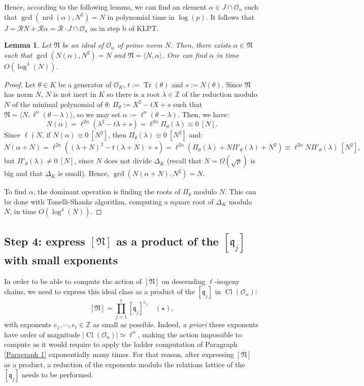 \documentclass[a4paper,10pt,notitlepage]{report}
\theoremstyle{definition}
\theoremstyle{plain}
\newtheorem{Lemma}[Definition]{Lemma}
\theoremstyle{definition}
\newcommand{\Z}{\mathbb{Z}}
\newcommand{\m}[1]{\mathcal{#1}}
\newcommand{\mO}{\mathcal{O}}
\renewcommand{\(}{\left(}
\renewcommand{\)}{\right)}
\newcommand{\mf}[1]{\mathfrak{#1}}
\DeclareMathOperator{\Tr}{Tr}
\DeclareMathOperator{\Cl}{Cl}
\DeclareMathOperator{\nrd}{nrd}
\begin{document}
Hence, according to the following lemma, we can find an element $\alpha\in J\cap \mO_n$ such that $\gcd(\nrd(\alpha),N^2)=N$ in polynomial time in $\log(p)$.  It follows that $J=\m{R}N+\m{R}\alpha=\m{R}\cdot J\cap\mO_n$ as in step b of KLPT.

\begin{Lemma}
Let $\mf{N}$ be an ideal of $\mO_n$ of prime norm $N$. Then, there exists $\alpha\in \mf{N}$ such that $\gcd(N(\alpha),N^2)=N$ and $\mf{N}=\langle N,\alpha\rangle$. One can find $\alpha$ in time $O(\log^4(N))$.
\end{Lemma}

\begin{proof}
Let $\theta\in K$ be a generator of $\mO_K$, $t:=\Tr(\theta)$ and $s:=N(\theta)$. Since $\mf{N}$ has norm $N$, $N$ is not inert in $K$ so there is a root $\lambda\in\Z$ of the reduction modulo $N$ of the minimal polynomial of $\theta$: $\Pi_\theta:=X^2-tX+s$ such that $\mf{N}=\langle N,\ell^n(\theta-\lambda)\rangle$, so we may set $\alpha:=\ell^n(\theta-\lambda)$. Then, we have:
\[N(\alpha)=\ell^{2n}(\lambda^2-t\lambda+s)=\ell^{2n}\Pi_\theta(\lambda)\equiv 0 \ [N].\]
Since $\ell\nmid N$, if $N(\alpha)\equiv 0 \ [N^2]$, then $\Pi_\theta(\lambda)\equiv 0 \ [N^2]$ and:
\[N(\alpha+N)=\ell^{2n}((\lambda+N)^2-t(\lambda+N)+s)=\ell^{2n}(\Pi_\theta(\lambda)+N\Pi'_\theta(\lambda)+N^2)\equiv \ell^{2n}N\Pi'_\theta(\lambda) \ [N^2],\]
but $\Pi'_\theta(\lambda)\neq 0 \ [N]$, since $N$ does not divide $\Delta_K$ (recall that $N=\Omega(\sqrt{p})$ is big and that $\Delta_K$ is small). Hence, $\gcd(N(\alpha+N),N^2)=N$.  

To find $\alpha$, the dominant operation is finding the roots of $\Pi_\theta$ modulo $N$.  This can be done with Tonelli-Shanks \cite[Algorithm 1.5.1]{Cohen1} algorithm, computing a square root of $\Delta_K$ modulo $N$, in time $O(\log^4(N))$.
\end{proof}

\subsection{Step 4: express $[\mf{N}]$ as a product of the $[\mf{q}_j]$ with small exponents}\label{Paragraph 11}

In order to be able to compute the action of $[\mf{N}]$ on descending $\ell$-isogeny chains, we need to express this ideal class as a product of the $[\mf{q}_j]$ in $\Cl(\mO_n)$:
\[[\mf{N}]=\prod_{j=1}^t[\mf{q}_j]^{e_j}\quad (\star),\]
with exponents $e_1, \cdots, e_{t}\in\Z$ as small as possible. Indeed, \emph{a priori} these exponents have order of magnitude $|\Cl(\mO_n)|\simeq\ell^n$, making the action impossible to compute as it would require to apply the ladder computation of Paragraph \ref{Paragraph 1} exponentially many times. For that reason, after expressing $[\mf{N}]$ as a product, a reduction of the exponents modulo the relations lattice of the $[\mf{q}_j]$ needs to be performed.
\end{document}
